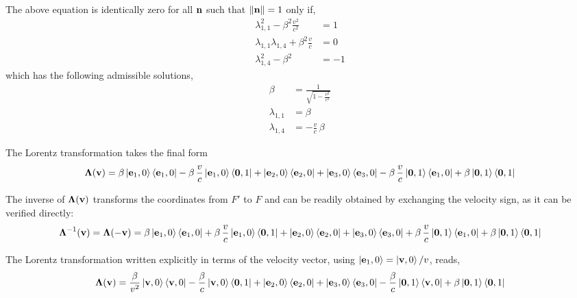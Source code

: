 \documentclass[12pt]{article}
\begin{document}
The above equation is identically zero for all $\vb{n}$ such that $\|\vb{n}\| = 1$ only if,
\begin{align}
  \lambda_{1,1}^2 - \beta^2\displaystyle\frac{v^2}{c^2} &= 1 \\
  \lambda_{1,1}\lambda_{1,4} + \beta^2\displaystyle\frac{v}{c} &= 0 \\
  \lambda_{1,4}^2 - \beta^2 &= -1
\end{align}
which has the following admissible solutions,
\begin{align}
  \beta         &= \frac{1}{\displaystyle\sqrt{1 - \frac{v^2}{c^2}}} \\
  \lambda_{1,1} &= \beta \\
  \lambda_{1,4} &= -\frac{v}{c}\,\beta
\end{align}

The Lorentz transformation takes the final form
\begin{equation}
  \boldsymbol{\Lambda}(\vb{v}) =
    \beta\ket{\vb{e}_1,0}\bra{\vb{e}_1,0}
    - \beta\,\frac{v}{c}\ket{\vb{e}_1,0}\bra{\vb{0},1}
    + \ket{\vb{e}_2,0}\bra{\vb{e}_2,0}
    + \ket{\vb{e}_3,0}\bra{\vb{e}_3,0}
    - \beta\,\frac{v}{c}\ket{\vb{0},1}\bra{\vb{e}_1,0}
    + \beta\ket{\vb{0},1}\bra{\vb{0},1}
  \label{eq:Lorentz_transformation}
\end{equation}

The inverse of $\boldsymbol{\Lambda}(\vb{v})$ transforms the coordinates from $F'$ to $F$ and
can be readily obtained by exchanging the velocity sign, as it can be verified directly:
\begin{equation}
  \boldsymbol{\Lambda}^{-1}(\vb{v}) = \boldsymbol{\Lambda}(-\vb{v}) =
    \beta\ket{\vb{e}_1,0}\bra{\vb{e}_1,0}
    + \beta\,\frac{v}{c}\ket{\vb{e}_1,0}\bra{\vb{0},1}
    + \ket{\vb{e}_2,0}\bra{\vb{e}_2,0}
    + \ket{\vb{e}_3,0}\bra{\vb{e}_3,0}
    + \beta\,\frac{v}{c}\ket{\vb{0},1}\bra{\vb{e}_1,0}
    + \beta\ket{\vb{0},1}\bra{\vb{0},1}
  \label{eq:Lorentz_inverse}
\end{equation}

The Lorentz transformation written explicitly in terms of the velocity vector, using
$\ket{\vb{e}_1,0} = \ket{\vb{v},0}/v$, reads,
\begin{equation}
  \boldsymbol{\Lambda}(\vb{v}) =
    \frac{\beta}{v^2}\ket{\vb{v},0}\bra{\vb{v},0}
    - \frac{\beta}{c}\ket{\vb{v},0}\bra{\vb{0},1}
    + \ket{\vb{e}_2,0}\bra{\vb{e}_2,0}
    + \ket{\vb{e}_3,0}\bra{\vb{e}_3,0}
    - \frac{\beta}{c}\ket{\vb{0},1}\bra{\vb{v},0}
    + \beta\ket{\vb{0},1}\bra{\vb{0},1}
  \label{eq:Lorentz_in_velocity}
\end{equation}
\end{document}

